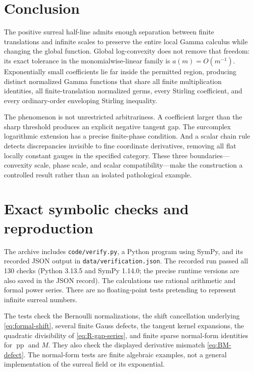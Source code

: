 \documentclass[11pt,letterpaper]{article}
\numberwithin{equation}{section}
\theoremstyle{plain}
\theoremstyle{definition}
\theoremstyle{remark}
\newcommand{\pp}{\operatorname{pp}}
\begin{document}
\section{Conclusion}
The positive surreal half-line admits enough separation between finite
translations and infinite scales to preserve the entire local Gamma
calculus while changing the global function. Global log-convexity does not
remove that freedom: its exact tolerance in the monomialwise-linear family
is $a(m)=O(m^{-1})$. Exponentially small coefficients lie far inside the
permitted region, producing distinct normalized Gamma functions that share
all finite multiplication identities, all finite-translation normalized
germs, every Stirling coefficient, and every ordinary-order enveloping
Stirling inequality.

The phenomenon is not unrestricted arbitrariness. A coefficient larger than
the sharp threshold produces an explicit negative tangent gap. The
surcomplex logarithmic extension has a precise finite-phase condition. And
a scalar chain rule detects discrepancies invisible to fine coordinate
derivatives, removing all flat locally constant gauges in the specified
category. These three boundaries---convexity scale, phase scale, and
scalar compatibility---make the construction a controlled result rather
than an isolated pathological example.

\appendix
\section{Exact symbolic checks and reproduction}\label{sec:verification}

The archive includes \texttt{code/verify.py}, a Python program using SymPy,
and its recorded JSON output in \texttt{data/verification.json}.
The recorded run passed all 130 checks (Python 3.13.5 and SymPy 1.14.0;
the precise runtime versions are also saved in the JSON record).
The calculations use rational arithmetic and formal power series. There are
no floating-point tests pretending to represent infinite surreal numbers.

The tests check the Bernoulli normalizations, the shift cancellation
underlying \eqref{eq:formal-shift}, several finite Gauss defects, the tangent
kernel expansions, the quadratic divisibility of
\eqref{eq:R-gap-series}, and finite sparse normal-form identities for
$\pp$ and $M$. They also check the displayed derivative mismatch
\eqref{eq:BM-defect}. The normal-form tests are finite algebraic examples,
not a general implementation of the surreal field or its exponential.
\end{document}
